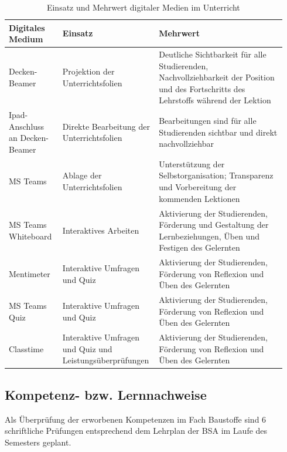 \documentclass[
11pt,
captions=tableheading,
smallheadings,
headsepline,
footsepline, 
parskip=half-,
]{scrartcl}
\begin{document}
\begin{table}[H]
    \centering
    \caption{Einsatz und Mehrwert digitaler Medien im Unterricht}
    \begin{tabularx}{\linewidth}{@{}>{\raggedright\arraybackslash}p{0.19\linewidth} p{0.3\linewidth} p{0.45\linewidth}@{}}
        \toprule
        \textbf{Digitales Medium} & \textbf{Einsatz} & \textbf{Mehrwert} \\
        \midrule
        Decken-Beamer & Projektion der Unterrichtsfolien & Deutliche Sichtbarkeit für alle Studierenden, Nachvollziehbarkeit der Position und des Fortschritts des Lehrstoffs während der Lektion \\
        \addlinespace
        Ipad-Anschluss an Decken-Beamer & Direkte Bearbeitung der Unterrichtsfolien & Bearbeitungen sind für alle Studierenden sichtbar und direkt nachvollziehbar \\
        \addlinespace
        MS Teams & Ablage der Unterrichtsfolien & Unterstützung der Selbstorganisation; Transparenz und Vorbereitung der kommenden Lektionen \\
        \addlinespace
        MS Teams Whiteboard & Interaktives Arbeiten & Aktivierung der Studierenden, Förderung und Gestaltung der Lernbeziehungen, Üben und Festigen des Gelernten \\
        \addlinespace
        Mentimeter & Interaktive Umfragen und Quiz & Aktivierung der Studierenden, Förderung von Reflexion und Üben des Gelernten \\
        \addlinespace
        MS Teams Quiz & Interaktive Umfragen und Quiz & Aktivierung der Studierenden, Förderung von Reflexion und Üben des Gelernten \\
        \addlinespace
        Classtime & Interaktive Umfragen und Quiz und Leistungsüberprüfungen & Aktivierung der Studierenden, Förderung von Reflexion und Üben des Gelernten \\
        \bottomrule
    \end{tabularx}
    \label{tab:digitales_medium}
\end{table}

\FloatBarrier
\subsection{Kompetenz- bzw. Lernnachweise}
Als Überprüfung der erworbenen Kompetenzen im Fach Baustoffe sind 6 schriftliche Prüfungen entsprechend dem Lehrplan der BSA im Laufe des Semesters geplant.
\end{document}
